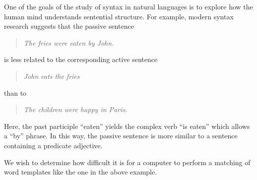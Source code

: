
One of the goals of the study of syntax in natural languages is to explore how
the human mind understands sentential structure. For example, modern syntax
research suggests that the passive sentence

\begin{quote}
  \emph{The fries were eaten by John.}
\end{quote}

is less related to the corresponding active sentence

\begin{quote}
  \emph{John eats the fries}
\end{quote}

than to

\begin{quote}
  \emph{The children were happy in Paris.}
\end{quote}

Here, the past participle ``eaten'' yields the complex verb ``is eaten'' which
allows a ``by'' phrase. In this way, the passive sentence is more similar to a
sentence containing a predicate adjective.

We wish to determine how difficult it is for a computer to perform a matching
of word templates like the one in the above example.
